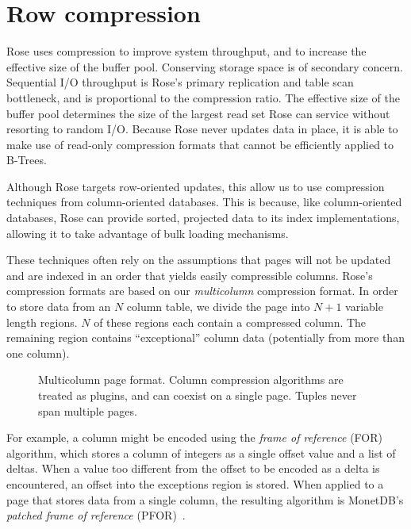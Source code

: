 \documentclass{vldb}
\newcommand{\rows}{Rose\xspace}
\newcommand{\rowss}{Rose's\xspace}
\begin{document}
\section{Row compression}

\rows uses compression to improve system throughput, and to increase
the effective size of the buffer pool.  Conserving storage space is of
secondary concern.  Sequential I/O throughput is \rowss primary
replication and table scan bottleneck, and is proportional to the
compression ratio.  The effective
size of the buffer pool determines the size of the largest read set
\rows can service without resorting to random I/O.
Because \rows never updates data in place, it
is able to make use of read-only compression formats that cannot be
efficiently applied to B-Trees.


Although \rows targets row-oriented updates, this allow us to use compression
techniques from column-oriented databases.  This is because, like column-oriented
databases, \rows can provide sorted, projected data to its index implementations,
allowing it to take advantage of bulk loading mechanisms.

These techniques often rely on the
assumptions that pages will not be updated and are indexed in an order that yields easily
compressible columns.  \rowss compression formats are based on our
{\em multicolumn} compression format.  In order to store data from
an $N$ column table, we divide the page into $N+1$ variable length
regions.  $N$ of these regions each contain a compressed column.  The
remaining region contains ``exceptional'' column data (potentially
from more than one column).

\begin{figure}
\centering {}
\caption{Multicolumn page format.  Column compression algorithms
are treated as plugins, and can coexist on a single page.  Tuples never span multiple pages.}
\label{fig:mc-fmt}
\end{figure}

For example, a column might be encoded using the {\em frame of
  reference} (FOR) algorithm, which stores a column of integers as a
single offset value and a list of deltas.  When a value too different
from the offset to be encoded as a delta is encountered, an offset
into the exceptions region is stored.  When applied to a page that
stores data from a single column, the resulting algorithm is MonetDB's
{\em patched frame of reference} (PFOR)~\cite{pfor}.
\end{document}
